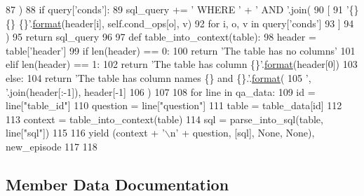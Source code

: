 \begin{DoxyCode}
87             )
88             \textcolor{keywordflow}{if} query[\textcolor{stringliteral}{'conds'}]:
89                 sql\_query += \textcolor{stringliteral}{' WHERE '} + \textcolor{stringliteral}{' AND '}.join(
90                     [
91                         \textcolor{stringliteral}{'\{\} \{\} \{\}'}.\hyperlink{namespaceparlai_1_1chat__service_1_1services_1_1messenger_1_1shared__utils_a32e2e2022b824fbaf80c747160b52a76}{format}(header[i], self.cond\_ops[o], v)
92                         \textcolor{keywordflow}{for} i, o, v \textcolor{keywordflow}{in} query[\textcolor{stringliteral}{'conds'}]
93                     ]
94                 )
95             \textcolor{keywordflow}{return} sql\_query
96 
97         \textcolor{keyword}{def }table\_into\_context(table):
98             header = table[\textcolor{stringliteral}{'header'}]
99             \textcolor{keywordflow}{if} len(header) == 0:
100                 \textcolor{keywordflow}{return} \textcolor{stringliteral}{'The table has no columns'}
101             \textcolor{keywordflow}{elif} len(header) == 1:
102                 \textcolor{keywordflow}{return} \textcolor{stringliteral}{'The table has column \{\}'}.\hyperlink{namespaceparlai_1_1chat__service_1_1services_1_1messenger_1_1shared__utils_a32e2e2022b824fbaf80c747160b52a76}{format}(header[0])
103             \textcolor{keywordflow}{else}:
104                 \textcolor{keywordflow}{return} \textcolor{stringliteral}{'The table has column names \{\} and \{\}.'}.\hyperlink{namespaceparlai_1_1chat__service_1_1services_1_1messenger_1_1shared__utils_a32e2e2022b824fbaf80c747160b52a76}{format}(
105                     \textcolor{stringliteral}{', '}.join(header[:-1]), header[-1]
106                 )
107 
108         \textcolor{keywordflow}{for} line \textcolor{keywordflow}{in} qa\_data:
109             id = line[\textcolor{stringliteral}{"table\_id"}]
110             question = line[\textcolor{stringliteral}{"question"}]
111             table = table\_data[id]
112 
113             context = table\_into\_context(table)
114             sql = parse\_into\_sql(table, line[\textcolor{stringliteral}{"sql"}])
115 
116             \textcolor{keywordflow}{yield} (context + \textcolor{stringliteral}{'\(\backslash\)n'} + question, [sql], \textcolor{keywordtype}{None}, \textcolor{keywordtype}{None}), new\_episode
117 
118 
\end{DoxyCode}


\subsection{Member Data Documentation}
\mbox{\label{classparlai_1_1tasks_1_1wikisql_1_1agents_1_1WikiSQLTeacher_acac9910a97f5b0ee9af7e9bd8a7e2d78}} 
